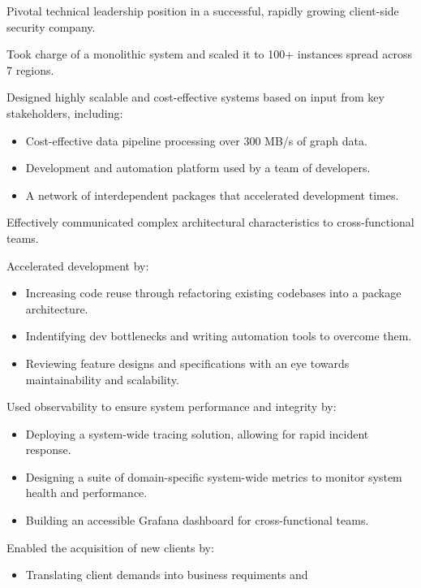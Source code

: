 
\begin{jobReflectizLead}
\item Pivotal technical leadership position in a successful, rapidly
  growing client-side security company.
\item Took charge of a monolithic system and scaled it to 100+
  instances spread across 7 regions.

\item Designed highly scalable and cost-effective systems based on
  input from key stakeholders, including:
  \begin{itemize}
    \item Cost-effective data pipeline processing over 300 MB/s of graph data.
    \item Development and automation platform used by a team of developers.
    \item A network of interdependent packages that accelerated
      development times.
  \end{itemize}
\item Effectively communicated complex architectural
  characteristics to cross-functional teams.
\item Accelerated development by:
  \begin{itemize}
    \item Increasing code reuse through refactoring existing
      codebases into a package architecture.
    \item Indentifying dev bottlenecks and writing automation tools
      to overcome them.
    \item Reviewing feature designs and specifications with an eye
      towards maintainability and scalability.
  \end{itemize}
\item Used observability to ensure system performance and integrity by:
  \begin{itemize}
    \item Deploying a system-wide tracing solution, allowing for
      rapid incident response.
    \item Designing a suite of domain-specific system-wide metrics
      to monitor system health and performance.
    \item Building an accessible Grafana dashboard for cross-functional teams.
  \end{itemize}
\item Enabled the acquisition of new clients by:
  \begin{itemize}
    \item Translating client demands into business requiments and

\end{itemize}
\end{jobReflectizLead}
